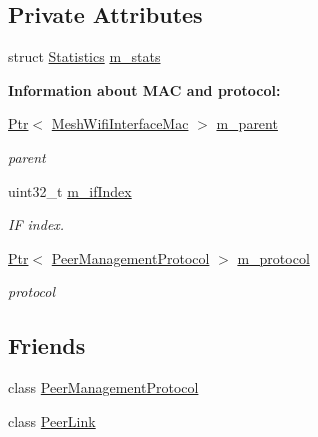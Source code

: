 \subsection*{Private Attributes}
\begin{DoxyCompactItemize}
\item 
struct \hyperlink{structns3_1_1dot11s_1_1PeerManagementProtocolMac_1_1Statistics}{Statistics} \hyperlink{classns3_1_1dot11s_1_1PeerManagementProtocolMac_aaaccd87941623a8bff20e8998908b518}{m\+\_\+stats}
\end{DoxyCompactItemize}
\begin{Indent}{\bf Information about M\+AC and protocol\+:}\par
\begin{DoxyCompactItemize}
\item 
\hyperlink{classns3_1_1Ptr}{Ptr}$<$ \hyperlink{classns3_1_1MeshWifiInterfaceMac}{Mesh\+Wifi\+Interface\+Mac} $>$ \hyperlink{classns3_1_1dot11s_1_1PeerManagementProtocolMac_a14edf9af29af164f967ccc6e77d8ea03}{m\+\_\+parent}
\begin{DoxyCompactList}\small\item\em parent \end{DoxyCompactList}\item 
uint32\+\_\+t \hyperlink{classns3_1_1dot11s_1_1PeerManagementProtocolMac_a6127e7b929975cae23d8ef639e254991}{m\+\_\+if\+Index}
\begin{DoxyCompactList}\small\item\em IF index. \end{DoxyCompactList}\item 
\hyperlink{classns3_1_1Ptr}{Ptr}$<$ \hyperlink{classns3_1_1dot11s_1_1PeerManagementProtocol}{Peer\+Management\+Protocol} $>$ \hyperlink{classns3_1_1dot11s_1_1PeerManagementProtocolMac_afbdd1f31cd54c320267ffb3426559095}{m\+\_\+protocol}
\begin{DoxyCompactList}\small\item\em protocol \end{DoxyCompactList}\end{DoxyCompactItemize}
\end{Indent}
\subsection*{Friends}
\begin{DoxyCompactItemize}
\item 
class \hyperlink{classns3_1_1dot11s_1_1PeerManagementProtocolMac_aad3da9b62656f5a6e24156893dc4e239}{Peer\+Management\+Protocol}
\item 
class \hyperlink{classns3_1_1dot11s_1_1PeerManagementProtocolMac_a0e7a63dea9bb09d1e45d9e8fd62d3a40}{Peer\+Link}
\end{DoxyCompactItemize}
